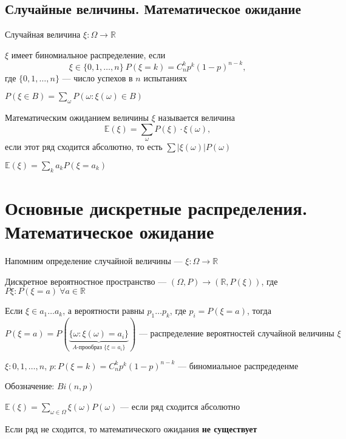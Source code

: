 \documentclass[a4paper, 10pt]{article}
\begin{document}
\subsection{Случайные величины. Математическое ожидание}
 Случайная величина $\xi:\Omega\rightarrow\mathbb{R}$

$\xi$ имеет биномиальное распределение, если
$$\xi\in\{0,1,\ldots,n\}\ P(\xi=k)=C_n^k p^k(1-p)^{n-k},$$
где $\{0,1,\ldots,n\}$ — число успехов в $n$ испытаниях

$P(\xi\in B)=\sum_{\omega} P(\omega:\xi(\omega)\in B)$

 Математическим ожиданием величины $\xi$ называется величина $$\mathbb{E}(\xi)=\sum_{\omega} P(\xi)\cdot\xi(\omega),$$
если этот ряд сходится абсолютно, то есть $\sum\left|\xi(\omega)\right|P(\omega)$

\theorem $\mathbb{E}(\xi)=\sum_{k}a_k P(\xi=a_k)$ 










\newpage
\section{Основные дискретные распределения. Математическое ожидание}
Напомним определение случайной величины — $\xi:\Omega\rightarrow\mathbb{R}$

 Дискретное вероятностное пространство — $(\Omega,P)\rightarrow(\mathbb{R},P(\xi))$, где $P\xi:P(\xi=a)\ \forall a\in\mathbb{R}$

Если $\xi\in a_1\ldots a_k$, а вероятности равны $p_1\ldots p_k$, где $p_i=P(\xi=a)$, тогда
$$P(\xi=a)=P\left(\underbrace{\{\omega:\xi(\omega)=a_i\}}_{A\text{-прообраз }\{\xi=a_i\}}\right)\text{ — распределение вероятностей случайной величины }\xi$$

\ex $\xi:0,1,\ldots,n$, $p:P(\xi=k)=C_n^k p^k(1-p)^{n-k}$ — биномиальное распредеденме

Обозначение: $Bi(n,p)$

 $\mathbb{E}(\xi)=\sum_{\omega\in\Omega} \xi(\omega)P(\omega)$ — если ряд сходится абсолютно

Если ряд не сходится, то математического ожидания \textbf{не существует}
\end{document}
